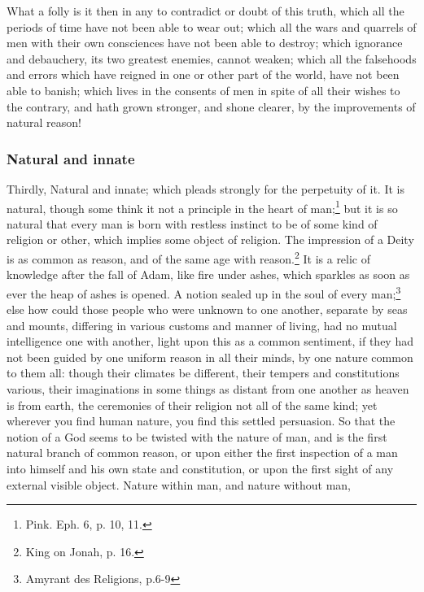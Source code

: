 \documentclass[a5paper]{book}
\begin{document}
What a folly is it then in any to contradict or doubt of this truth,
    which all the periods of time have not been able to wear out; 
    which all the wars and quarrels of men with their own consciences 
    have not been able to destroy; 
    which ignorance and debauchery, its two greatest enemies, cannot weaken; 
    which all the falsehoods and errors which have reigned 
    in one or other part of the world, 
    have not been able to banish; 
    which lives in the consents of men in spite of all their wishes 
    to the contrary, 
    and hath grown stronger, and shone clearer, 
    by the improvements of natural reason!

\subsubsection{Natural and innate}
Thirdly, Natural and innate; which pleads strongly for the perpetuity of it. 
It is natural, though some think it not a principle in the heart of man;\footnote{Pink. Eph. 6, p. 10, 11.}
    but it is so natural that every man is born 
    with restless instinct to be of some kind of religion or other, 
    which implies some object of religion. 
The impression of a Deity is as common as reason, 
    and of the same age with reason.\footnote{King on Jonah, p. 16.}
It is a relic of knowledge after the fall of Adam, 
    like fire under ashes, 
    which sparkles as soon
    as ever the heap of ashes is opened. 
A notion sealed up in the soul of every man;\footnote{Amyrant des Religions, p.6-9}
    else how could those people who were unknown to one another, 
    separate by seas and mounts, 
    differing in various customs and manner of living, 
    had no mutual intelligence one with another, 
    light upon this as a common sentiment, 
    if they had not been guided by one uniform reason in all their minds, 
    by one nature common to them all: 
    though their climates be different, 
    their tempers and constitutions various, 
    their imaginations in some things as distant from one another 
    as heaven is from earth, 
    the ceremonies of their religion not all of the same kind; 
    yet wherever you find human nature, 
    you find this settled persuasion. 
So that the notion of a God seems to be twisted with the nature of man, 
    and is the first natural branch of common reason, 
    or upon either the first inspection of a man into himself 
    and his own state and constitution, 
    or upon the first sight of any external visible object. 
Nature within man, and nature without man, 
\end{document}
